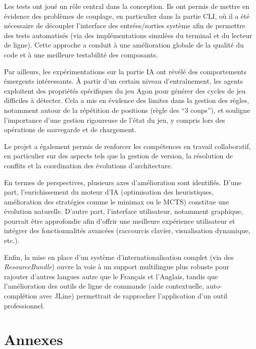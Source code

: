 \documentclass[a4paper]{article}
\begin{document}
Les tests ont joué un rôle central dans la conception. Ils ont permis de mettre en évidence des problèmes de couplage, en particulier dans la partie CLI, où il a été nécessaire de découpler l’interface des entrées/sorties système afin de permettre des tests automatisés (via des implémentations simulées du terminal et du lecteur de ligne). Cette approche a conduit à une amélioration globale de la qualité du code et à une meilleure testabilité des composants.

Par ailleurs, les expérimentations sur la partie IA ont révélé des comportements émergents intéressants. À partir d’un certain niveau d’entraînement, les agents exploitent des propriétés spécifiques du jeu Agon pour générer des cycles de jeu difficiles à détecter. Cela a mis en évidence des limites dans la gestion des règles, notamment autour de la répétition de positions (règle des “3 coups”), et souligne l’importance d’une gestion rigoureuse de l’état du jeu, y compris lors des opérations de sauvegarde et de chargement.

Le projet a également permis de renforcer les compétences en travail collaboratif, en particulier sur des aspects tels que la gestion de version, la résolution de conflits et la coordination des évolutions d’architecture.

\medskip

En termes de perspectives, plusieurs axes d’amélioration sont identifiés. D’une part, l’enrichissement du moteur d’IA (optimisation des heuristiques, amélioration des stratégies comme le minimax ou le MCTS) constitue une évolution naturelle. D’autre part, l’interface utilisateur, notamment graphique, pourrait être approfondie afin d’offrir une meilleure expérience utilisateur et intégrer des fonctionnalités avancées (raccourcis clavier, visualisation dynamique, etc.).

Enfin, la mise en place d’un système d’internationalisation complet (via des \textit{ResourceBundle}) ouvre la voie à un support multilingue plus robuste pour rajouter d'autres langues autre que le Français et l'Anglais, tandis que l’amélioration des outils de ligne de commande (aide contextuelle, auto-complétion avec JLine) permettrait de rapprocher l’application d’un outil professionnel.

\nocite{*}



\section*{Annexes}
\end{document}
